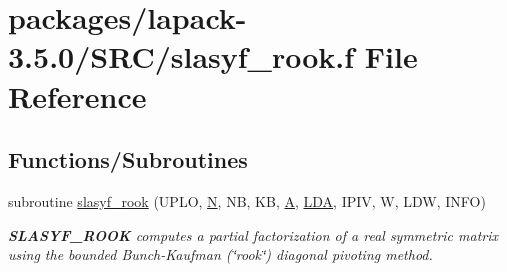 \hypertarget{slasyf__rook_8f}{}\section{packages/lapack-\/3.5.0/\+S\+R\+C/slasyf\+\_\+rook.f File Reference}
\label{slasyf__rook_8f}
\subsection*{Functions/\+Subroutines}
\begin{DoxyCompactItemize}
\item 
subroutine \hyperlink{group__realSYcomputational_gab56807ae53bfd2750b0a03d5cdc738a2}{slasyf\+\_\+rook} (U\+P\+L\+O, \hyperlink{polmisc_8c_a0240ac851181b84ac374872dc5434ee4}{N}, N\+B, K\+B, \hyperlink{classA}{A}, \hyperlink{example__user_8c_ae946da542ce0db94dced19b2ecefd1aa}{L\+D\+A}, I\+P\+I\+V, W, L\+D\+W, I\+N\+F\+O)
\begin{DoxyCompactList}\small\item\em {\bfseries S\+L\+A\+S\+Y\+F\+\_\+\+R\+O\+O\+K} computes a partial factorization of a real symmetric matrix using the bounded Bunch-\/\+Kaufman (\char`\"{}rook\char`\"{}) diagonal pivoting method. \end{DoxyCompactList}\end{DoxyCompactItemize}
